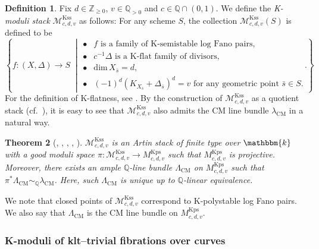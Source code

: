 \documentclass[12pt,twoside]{amsart}
\newtheorem{thm}{Theorem}[section]
\theoremstyle{definition}
\newtheorem{defn}[thm]{Definition}
\begin{document}
\begin{defn}\label{defn--Kss-moduli}
Fix $d\in\mathbb{Z}_{\ge0}$, $v\in\mathbb{Q}_{>0}$ and $c\in\mathbb{Q}\cap(0,1)$.
We define the {\em K-moduli stack} $\mathcal{M}^{\mathrm{Kss}}_{c,d,v}$ as follows: For any scheme $S$, the collection $\mathcal{M}^{\mathrm{Kss}}_{c,d,v}(S)$ is defined to be
\[
\left\{
 f\colon(X,\Delta)\to S
\;\middle|
\begin{array}{rl}
\bullet\!\!&\text{$f$ is a family of K-semistable log Fano pairs,}\\
\bullet\!\!&\text{$c^{-1}\Delta$ is a K-flat family of divisors,}\\
\bullet\!\!&\text{$\mathrm{dim}\,X_{\bar{s}}=d$,}\\
\bullet\!\!&\text{$(-1)^d(K_{X_{\bar{s}}}+\Delta_{\bar{s}})^d=v$ for any geometric point $\bar{s}\in S$.}
\end{array}\right\}.
    \]
    For the definition of K-flatness, see \cite[Definition 7.1]{kollar-moduli}.
By the construction of $\mathcal{M}^{\mathrm{Kss}}_{c,d,v}$ as a quotient stack (cf.~\cite[Theorem 2.21]{XZ1}), it is easy to see that $\mathcal{M}^{\mathrm{Kss}}_{c,d,v}$ also admits the CM line bundle $\lambda_{\mathrm{CM}}$ in a natural way.
\end{defn}
    \begin{thm}[{\cite{ABHLX}, \cite{BLX}, \cite{BHLLX}, \cite{XZ1}, \cite[Theorem 1.3]{LXZ}}]\label{thm--K-moduli--of--log--Fano}
        $\mathcal{M}^{\mathrm{Kss}}_{c,d,v}$ is an Artin stack of finite type over $\mathbbm{k}$ with a good moduli space $\pi\colon \mathcal{M}^{\mathrm{Kss}}_{c,d,v}\to  M^{\mathrm{Kps}}_{c,d,v}$ such that $M^{\mathrm{Kps}}_{c,d,v}$ is projective.
        Moreover, there exists an ample $\mathbb{Q}$-line bundle $\Lambda_{\mathrm{CM}}$ on $M^{\mathrm{Kps}}_{c,d,v}$ such that $\pi^*\Lambda_{\mathrm{CM}}\sim_{\mathbb{Q}}\lambda_{\mathrm{CM}}$.
        Here, such $\Lambda_{\mathrm{CM}}$ is unique up to $\mathbb{Q}$-linear equivalence.
    \end{thm}

    We note that closed points of $\mathcal{M}^{\mathrm{Kss}}_{c,d,v}$ correspond to K-polystable log Fano pairs.
    We also say that $\Lambda_{\mathrm{CM}}$ is the CM line bundle on $M^{\mathrm{Kps}}_{c,d,v}$.

\subsubsection{K-moduli of klt--trivial fibrations over curves}\label{subsec--k-moduli--klt--trivial}
\end{document}
